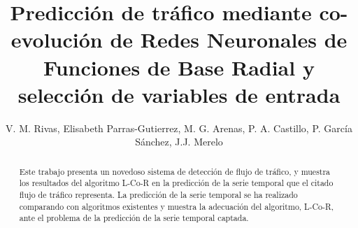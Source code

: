 \documentclass[runningheads]{llncs}
\begin{document}
\mainmatter  %



\title{Predicción de tr\'afico mediante co-evolución de Redes Neuronales de Funciones de Base Radial y selección de variables de
entrada }

\author{V. M. Rivas, Elisabeth Parras-Gutierrez, M. G. Arenas, P. A. Castillo, P. García
Sánchez, J.J. Merelo}

%







\maketitle
\begin{abstract}
Este trabajo presenta un novedoso sistema de detección de flujo de tráfico, y muestra los resultados del algoritmo L-Co-R en la
predicción de la serie temporal que el citado flujo de tráfico representa. La predicción de la serie temporal se ha realizado
comparando con algoritmos existentes y muestra la adecuación del algoritmo, L-Co-R, ante el
problema de la predicción de la serie temporal captada.
\end{abstract}
\end{document}
